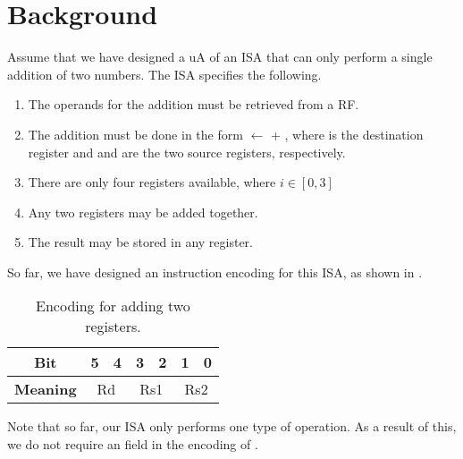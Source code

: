 \documentclass[number=03]{assignment}
\begin{document}
\section{Background}\label{Sec:Background}
Assume that we have designed a \ac{uA} of an \ac{ISA} that can only perform a single addition of two numbers.
The \ac{ISA} specifies the following.
\begin{enumerate}
\item The operands for the addition must be retrieved from a \ac{RF}.  
\item The addition must be done in the form \Rd $\leftarrow$  + , where \Rd is the destination register and  and  are the two source registers, respectively.
\item There are only four registers  available, where $i\in[0,3]$
\item Any two registers may be added together.
\item The result may be stored in any register.
\end{enumerate}
So far, we have designed an instruction encoding for this \ac{ISA}, as shown in .
%

\begin{table}[htbp]
    \centering
    \caption{Encoding for adding two registers.}
    \label{Table:basic_encoding}
    \begin{tabular}{|c|c|c|c|c|c|c|}
      \hline
      \textbf{Bit}     & 5 & 4 & 3 & 2 & 1 & 0 \\ \hline
      \textbf{Meaning} & \multicolumn{2}{c|}{Rd} & \multicolumn{2}{c|}{Rs1} & \multicolumn{2}{c|}{Rs2} \\
      \hline
  	\end{tabular}
  \end{table}
%
%

Note that so far, our \ac{ISA} only performs one type of operation.
As a result of this, we do not require an  field in the encoding of .
 
\end{document}
